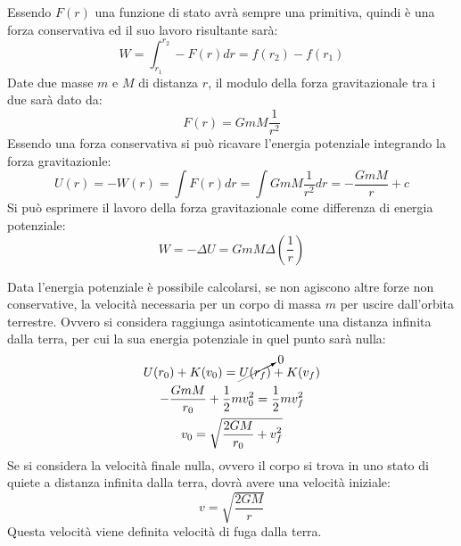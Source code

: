 \documentclass{article}
\numberwithin{equation}{subsection}
\begin{document}
Essendo $F(r)$ una funzione di stato avrà sempre una primitiva, quindi è una forza conservativa ed il suo lavoro risultante sarà:
\begin{equation*}
    W=\displaystyle\int_{r_1}^{r_2}-F(r)dr=f(r_2)-f(r_1)
\end{equation*}
Date due masse $m$ e $M$ di distanza $r$, il modulo della forza gravitazionale tra i due sarà dato da:  
\begin{equation}
    F(r)=GmM\displaystyle\frac{1}{r^2}
\end{equation}
Essendo una forza conservativa si può ricavare l'energia potenziale integrando la forza gravitazionle:
\begin{equation}
    U(r)=-W(r)=\displaystyle\int F(r)dr=\displaystyle\int GmM\frac{1}{r^2}dr=-\frac{GmM}{r}+c
\end{equation}
Si può esprimere il lavoro della forza gravitazionale come differenza di energia potenziale:
\begin{equation}
    W=-\Delta U=GmM\Delta\left(\displaystyle\frac{1}{r}\right)
\end{equation}

Data l'energia potenziale è possibile calcolarsi, se non agiscono altre forze non conservative, la velocità necessaria per un corpo di 
massa $m$ per uscire dall'orbita terrestre. Ovvero si considera raggiunga asintoticamente una distanza infinita dalla terra, per 
cui la sua energia potenziale in quel punto sarà nulla:
\begin{gather*}
    U(r_0)+K(v_0)=\cancelto{0}{U(r_f)}+K(v_f)\\
    -\displaystyle\frac{GmM}{r_0}+\frac{1}{2}mv_0^2=\frac{1}{2}mv_f^2\\
    v_0=\displaystyle\sqrt{\displaystyle\frac{2GM}{r_0}+v_f^2}
\end{gather*}
Se si considera la velocità finale nulla, ovvero il corpo si trova in uno stato di quiete a distanza infinita dalla terra, dovrà avere 
una velocità iniziale:
\begin{equation}
    v=\displaystyle\sqrt{\frac{2GM}{r}}
\end{equation}
Questa velocità viene definita velocità di fuga dalla terra. 
\end{document}

